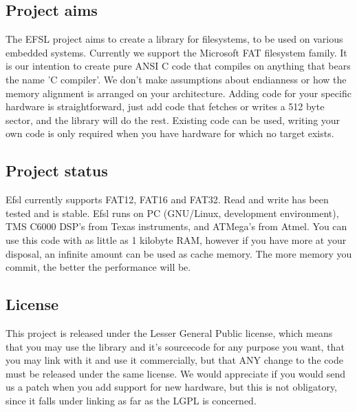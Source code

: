 \subsection{Project aims}
The EFSL project aims to create a library for filesystems, to be used on 
various embedded systems. Currently we support the Microsoft FAT filesystem 
family. It is our intention to create pure ANSI C code that compiles on 
anything that bears the name 'C compiler'. We don't make assumptions about 
endianness or how the memory alignment is arranged on your architecture.
\newline\newline
Adding code for your specific hardware is straightforward, just add code that 
fetches or writes a 512 byte sector, and the library will do the rest. 
Existing code can be used, writing your own code is only required when you 
have hardware for which no target exists.
\subsection{Project status}
Efsl currently supports FAT12, FAT16 and FAT32. Read and write has been tested 
and is stable. Efsl runs on PC (GNU/Linux, development environment), 
TMS C6000 DSP's from Texas instruments, and ATMega's from Atmel.
You can use this code with as little as 1 kilobyte RAM, however if you have 
more at your disposal, an infinite amount can be used as cache memory. 
The more memory you commit, the better the performance will be.
\subsection{License}
This project is released under the Lesser General Public license, which 
means that you may use the library and it's sourcecode for any purpose you want, 
that you may link with it and use it commercially, but that ANY change to the 
code must be released under the same license. We would appreciate if you would  send
us a patch when you add support for new hardware, but this is not obligatory, since it
falls under linking as far as the LGPL is concerned.
